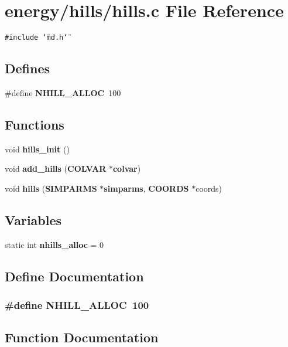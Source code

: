 \section{energy/hills/hills.c File Reference}
\label{hills_8c}
{\tt \#include \char`\"{}md.h\char`\"{}}\par
\subsection*{Defines}
\begin{CompactItemize}
\item 
\#define {\bf NHILL\_\-ALLOC}~100
\end{CompactItemize}
\subsection*{Functions}
\begin{CompactItemize}
\item 
void {\bf hills\_\-init} ()
\item 
void {\bf add\_\-hills} ({\bf COLVAR} $\ast${\bf colvar})
\item 
void {\bf hills} ({\bf SIMPARMS} $\ast${\bf simparms}, {\bf COORDS} $\ast$coords)
\end{CompactItemize}
\subsection*{Variables}
\begin{CompactItemize}
\item 
static int {\bf nhills\_\-alloc} = 0
\end{CompactItemize}


\subsection{Define Documentation}
\subsubsection{\setlength{\rightskip}{0pt plus 5cm}\#define NHILL\_\-ALLOC~100}\label{hills_8c_a93d5f72fb4435695fad529ae5d597e1}




\subsection{Function Documentation}
